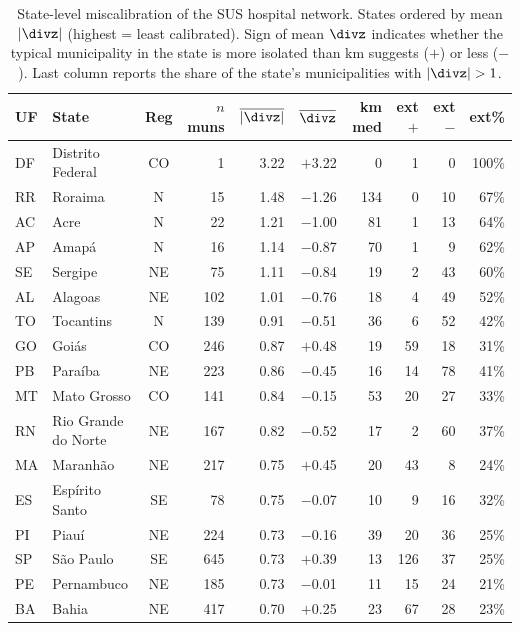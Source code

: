 \begin{table}[ht]
\centering
\caption{State-level miscalibration of the SUS hospital network. States ordered by mean $|\divz|$ (highest = least calibrated). Sign of mean $\divz$ indicates whether the typical municipality in the state is more isolated than km suggests ($+$) or less ($-$). Last column reports the share of the state's municipalities with $|\divz| > 1$.}
\label{tab:uf-ranking}
\small
\setlength{\tabcolsep}{4pt}
\begin{tabular}{llcrrrrrrr}
\toprule
UF & State & Reg & $n$ muns & $\overline{|\divz|}$ & $\overline{\divz}$ & km med & ext$+$ & ext$-$ & ext\% \\
\midrule
  DF & Distrito Federal & CO &     1 & 3.22 & $+$3.22 & 0 &   1 &   0 & 100\% \\
  RR & Roraima & N &    15 & 1.48 & $-$1.26 & 134 &   0 &  10 & 67\% \\
  AC & Acre & N &    22 & 1.21 & $-$1.00 & 81 &   1 &  13 & 64\% \\
  AP & Amap{\'a} & N &    16 & 1.14 & $-$0.87 & 70 &   1 &   9 & 62\% \\
  SE & Sergipe & NE &    75 & 1.11 & $-$0.84 & 19 &   2 &  43 & 60\% \\
  AL & Alagoas & NE &   102 & 1.01 & $-$0.76 & 18 &   4 &  49 & 52\% \\
  TO & Tocantins & N &   139 & 0.91 & $-$0.51 & 36 &   6 &  52 & 42\% \\
  GO & Goi{\'a}s & CO &   246 & 0.87 & $+$0.48 & 19 &  59 &  18 & 31\% \\
  PB & Para{\'i}ba & NE &   223 & 0.86 & $-$0.45 & 16 &  14 &  78 & 41\% \\
  MT & Mato Grosso & CO &   141 & 0.84 & $-$0.15 & 53 &  20 &  27 & 33\% \\
  RN & Rio Grande do Norte & NE &   167 & 0.82 & $-$0.52 & 17 &   2 &  60 & 37\% \\
  MA & Maranh{\~a}o & NE &   217 & 0.75 & $+$0.45 & 20 &  43 &   8 & 24\% \\
  ES & Esp{\'i}rito Santo & SE &    78 & 0.75 & $-$0.07 & 10 &   9 &  16 & 32\% \\
  PI & Piau{\'i} & NE &   224 & 0.73 & $-$0.16 & 39 &  20 &  36 & 25\% \\
  SP & S{\~a}o Paulo & SE &   645 & 0.73 & $+$0.39 & 13 & 126 &  37 & 25\% \\
  PE & Pernambuco & NE &   185 & 0.73 & $-$0.01 & 11 &  15 &  24 & 21\% \\
  BA & Bahia & NE &   417 & 0.70 & $+$0.25 & 23 &  67 &  28 & 23\% \\

\end{tabular}
\end{table}
